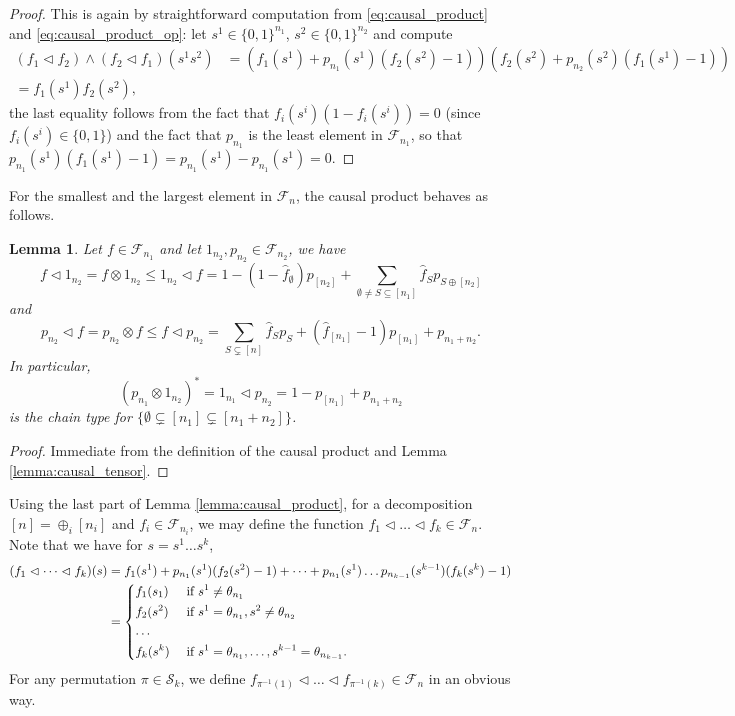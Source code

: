 \documentclass[12pt]{article}
\newtheorem{lemma}{Lemma}
\theoremstyle{definition}
\theoremstyle{remark}
\def\Fe{\mathcal F}
\def\permut{\mathscr{S}}
\def\vtl{\vartriangleleft}
\begin{document}
\begin{proof} This is again by straightforward computation from \eqref{eq:causal_product}
and \eqref{eq:causal_product_op}: let
$s^1\in \{0,1\}^{n_1}$, $s^2\in \{0,1\}^{n_2}$ and compute
\begin{align*}
(f_1\vtl f_2)\wedge (f_2\vtl
f_1)(s^1s^2)&=\left(f_1(s^1)+p_{n_1}(s^1)(f_2(s^2)-1)\right)\left(f_2(s^2)+p_{n_2}(s^2)(f_1(s^1)-1)\right)\\
=f_1(s^1)f_2(s^2),
\end{align*}
the last equality follows from the fact that $f_i(s^i)(1-f_i(s^i))=0$ (since $f_i(s^i)\in
\{0,1\}$) and the fact that $p_{n_1}$ is the least element in $\Fe_{n_1}$, so that
$p_{n_1}(s^1)(f_1(s^1)-1)=p_{n_1}(s^1)-p_{n_1}(s^1)=0$. 

\end{proof}

For the smallest and the largest element in $\Fe_n$, the causal product behaves as
follows.
\begin{lemma}\label{lemma:onechain_causal}
Let  $f\in \Fe_{n_1}$ and let $1_{n_2}, p_{n_2}\in \Fe_{n_2}$, we have
\[
f\vtl 1_{n_2}= f\otimes 1_{n_2}\le 1_{n_2}\vtl f =1-(1-\hat
f_\emptyset)p_{[n_2]}+\sum_{\emptyset \ne S\subseteq [n_1]} \hat f_S p_{S\oplus [n_2]}
\]
and
\[
p_{n_2} \vtl f=p_{n_2}\otimes f \le f\vtl p_{n_2}=\sum_{S\subsetneq [n]} \hat
f_Sp_S+(\hat f_{[n_1]}-1)p_{[n_1]}+p_{n_1+n_2}.
\]
In particular,
\[
(p_{n_1}\otimes 1_{n_2})^*=1_{n_1}\vtl p_{n_2}=1-p_{[n_1]}+p_{n_1+n_2}
\]
is the chain type for $\{\emptyset\subsetneq [n_1]\subsetneq [n_1+n_2]\}$.
\end{lemma}

\begin{proof}
Immediate from the definition of the causal product and Lemma \ref{lemma:causal_tensor}.

\end{proof}







Using the last part of Lemma \ref{lemma:causal_product},
for a decomposition $[n]=\oplus_i[n_i]$ and $f_i\in \Fe_{n_i}$,  we may define the function $f_1\vtl\dots \vtl f_k\in
\Fe_{n}$. Note that we have for $s=s^1\dots s^k$, 
\begin{align*}
(f_1\vtl \dots\vtl f_k)(s)&=f_1(s^1)+p_{n_1}(s^1)(f_2(s^2)-1)+\dots + p_{n_1}(s^1)\dots
p_{n_{k-1}}(s^{k-1})(f_k(s^k)-1)\\
&= \begin{dcases} f_1(s_1) & \text{ if } s^1\ne \theta_{n_1}\\
f_2(s^2) & \text{ if } s^1=\theta_{n_1}, s^2\ne \theta_{n_2}\\
\dots & \\
f_k(s^k) & \text{ if } s^1=\theta_{n_1},\dots,  s^{k-1}=\theta_{n_{k-1}}.
\end{dcases}
\end{align*}
For any permutation $\pi\in \permut_k$, we define  $f_{\pi^{-1}(1)}\vtl \dots \vtl
f_{\pi^{-1}(k)}\in \Fe_n$ in an obvious way.
\end{document}
